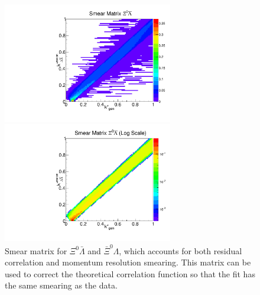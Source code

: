 \begin{figure}[ht]
\begin{minipage}{17.5pc}
\includegraphics[width=17.5pc]{Figures/SmearMatrices/2016-7-19-SmearMatrixXi0LambdaNormLA.pdf}
\end{minipage}\hspace{0.5pc}
\begin{minipage}{17.5pc}
\includegraphics[width=17.5pc]{Figures/SmearMatrices/2016-7-19-SmearMatrixXi0LambdaNormLALog.pdf}
\end{minipage} 
\caption[Smear matrix -- $\Xi^0\bar{\Lambda}$ and $\bar{\Xi}^0\Lambda$]{
Smear matrix for $\Xi^0\bar{\Lambda}$ and $\bar{\Xi}^0\Lambda$, which accounts for both residual correlation and momentum resolution smearing. This matrix can be used to correct the theoretical correlation function so that the fit has the same smearing as the data.
}
\end{figure}

